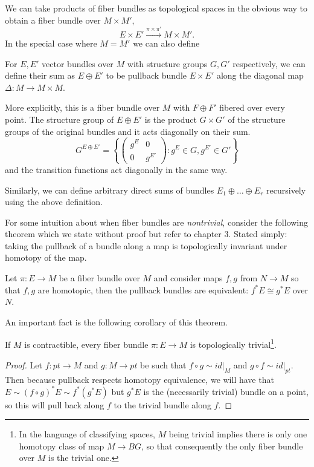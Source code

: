 		We can take products of fiber bundles as topological spaces in the obvious way to obtain a fiber bundle over $M \times M'$,
		\[
			E \times E' \xrightarrow{\pi \times \pi'} M \times M'.
		\]
		In the special case where $M = M'$ we can also define 
		\begin{defn}
			For $E, E'$ vector bundles over $M$ with structure groups $G, G'$ respectively, we can define their sum as $E \oplus E'$ to be pullback bundle $E \times E'$ along the diagonal map $\Delta: M \rightarrow M \times M$.
			
		More explicitly, this is a fiber bundle over $M$ with $F \oplus F'$ fibered over every point. 
		The structure group of $E \oplus E'$ is the product $G \times G'$ of the structure groups of the original bundles and it acts diagonally on their sum.
		\[
			G^{E \oplus E'} = \left \{ \begin{pmatrix}
				g^E & 0 \\
				0 & g^{E'}
			\end{pmatrix} : g^E \in G, g^{E'} \in G' \right \}
		\]
		and the transition functions act diagonally in the same way. 
		\end{defn}
		Similarly, we can define arbitrary direct sums of bundles $E_1 \oplus \dots \oplus E_r$ recursively using the above definition.
		
		For some intuition about when fiber bundles are \emph{nontrivial}, consider the following theorem which we state without proof but refer to \cite{bott1982} chapter 3. Stated simply: taking the pullback of a bundle along a map is topologically invariant under homotopy of the map. 
		\begin{theorem}
			Let $\pi:E \rightarrow M$ be a fiber bundle over $M$ and consider maps $f, g$ from $N \rightarrow M$ so that $f, g$ are homotopic, then the pullback bundles are equivalent: $f^* E \cong g^* E$ over $N$.
		\end{theorem}
		An important fact is the following corollary of this theorem.
		\begin{cor}
			If $M$ is contractible, every fiber bundle $\pi: E \rightarrow M$ is topologically trivial\footnote{In the language of classifying spaces, $M$ being trivial implies there is only one homotopy class of map $M \to BG$, so that consequently the only fiber bundle over $M$ is the trivial one.}.
		\end{cor}
		\begin{proof}
			Let $f: pt \to M$ and $g: M \to pt$ be such that $f \circ g \sim id|_M$ and $g \circ f \sim id|_{pt}$. Then because pullback respects homotopy equivalence, we will have that $E \sim (f \circ g)^* E \sim f^* (g^*E)$ but $g^* E$ is the (necessarily trivial) bundle on a point, so this will pull back along $f$ to the trivial bundle along $f$.
		\end{proof}
		
